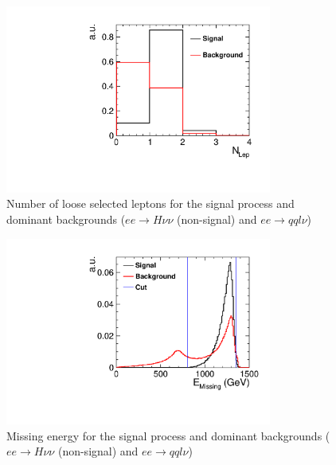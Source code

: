 \begin{figure}
  \centering
  \includegraphics[width=0.78\textwidth,keepaspectratio]{HiggsAnalysis/figures/nLep_PreSelection}
  \caption[Number of reconstructed loose selected lepton for signal and background events]{Number of loose selected leptons for the signal process and dominant backgrounds ($ee\rightarrow H\nu\nu$ (non-signal) and $ee\rightarrow qql\nu$)}
  \label{fig:nLepPreSel}
\end{figure}

\begin{figure}
  \centering
  \includegraphics[width=0.78\textwidth,keepaspectratio]{HiggsAnalysis/figures/EMissing_PreSelection}
  \caption[Missing energy of signal and background events]{Missing energy for the signal process and dominant backgrounds ($ee\rightarrow H\nu\nu$ (non-signal) and $ee\rightarrow qql\nu$)}
  \label{fig:EMissPreSel}
\end{figure}

